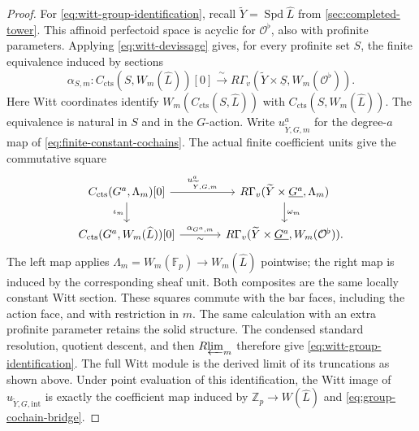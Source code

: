 \documentclass[11pt]{article}
\numberwithin{equation}{section}
\theoremstyle{definition}
\theoremstyle{remark}
\begin{document}
\begin{proof}
For \eqref{eq:witt-group-identification}, recall
$\widetilde Y=\operatorname{Spd}\widehat L$ from \cref{sec:completed-tower}.
This affinoid perfectoid space is acyclic for $\mathcal O^\flat$, also with
profinite parameters.  Applying \eqref{eq:witt-devissage} gives, for
every profinite set $S$, the finite equivalence induced by sections
\[
 \alpha_{S,m}:C_{\mathrm{cts}}(S,W_m(\widehat L))[0]
       \xrightarrow{\ \sim\ }
 R\Gamma_v(\widetilde Y\times\underline S,W_m(\mathcal O^\flat)).
\]
Here Witt coordinates identify $W_m(C_{\mathrm{cts}}(S,\widehat L))$ with
$C_{\mathrm{cts}}(S,W_m(\widehat L))$.  The equivalence is natural in $S$
and in the $G$-action.  Write $u^a_{\widetilde Y,G,m}$ for the
degree-$a$ map of \eqref{eq:finite-constant-cochains}.  The actual
finite coefficient units give the commutative square
\begin{equation}\label{eq:finite-witt-constant-square}
\begin{tikzcd}[column sep=large]
 C_{\mathrm{cts}}(G^a,\Lambda_m)[0]
    \arrow[r,"u^a_{\widetilde Y,G,m}"] \arrow[d,"\iota_m"']
   &R\Gamma_v(\widetilde Y\times\underline{G^a},\Lambda_m)
       \arrow[d,"\omega_m"]\\
 C_{\mathrm{cts}}(G^a,W_m(\widehat L))[0]
    \arrow[r,"\alpha_{G^a,m}","\sim"']
   &R\Gamma_v(\widetilde Y\times\underline{G^a},W_m(\mathcal O^\flat)).
\end{tikzcd}
\end{equation}
The left map applies $\Lambda_m=W_m(\mathbb F_p)\to W_m(\widehat L)$
pointwise; the right map is induced by the corresponding sheaf unit.
Both composites are the same locally constant Witt section.  These
squares commute with the bar faces, including the action face, and
with restriction in $m$.  The same calculation with an extra
profinite parameter retains the solid structure.  The condensed
standard resolution, quotient descent, and then $R\!\varprojlim_m$ therefore
give \eqref{eq:witt-group-identification}.  The full Witt module is
the derived limit of its truncations as shown above.  Under point
evaluation of this identification, the Witt image of
$u_{\widetilde Y,G,\mathrm{int}}$ is exactly the coefficient map
induced by $\mathbb Z_p\to W(\widehat L)$ and
\eqref{eq:group-cochain-bridge}.


\end{proof}
\end{document}
